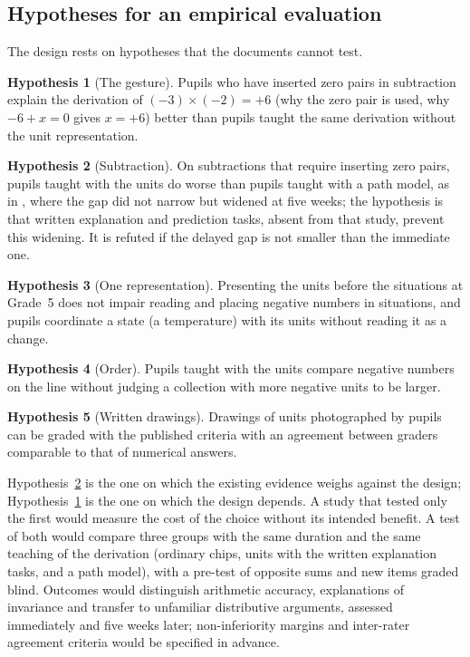 \documentclass[11pt,a4paper]{article}
\theoremstyle{definition}
\newtheorem{hypothesis}{Hypothesis}
\begin{document}
\subsection{Hypotheses for an empirical evaluation}
The design rests on hypotheses that the documents cannot test.
\begin{hypothesis}[The gesture]\label{hyp:gesture}
Pupils who have inserted zero pairs in subtraction explain the derivation of $(-3)\times(-2)=+6$ (why the zero pair is used, why $-6+x=0$ gives $x=+6$) better than pupils taught the same derivation without the unit representation.
\end{hypothesis}
\begin{hypothesis}[Subtraction]\label{hyp:subtraction}
On subtractions that require inserting zero pairs, pupils taught with the units do worse than pupils taught with a path model, as in \citet{NurnbergerHaag2015PMENA}, where the gap did not narrow but widened at five weeks; the hypothesis is that written explanation and prediction tasks, absent from that study, prevent this widening. It is refuted if the delayed gap is not smaller than the immediate one.
\end{hypothesis}
\begin{hypothesis}[One representation]
Presenting the units before the situations at Grade~5 does not impair reading and placing negative numbers in situations, and pupils coordinate a state (a temperature) with its units without reading it as a change.
\end{hypothesis}
\begin{hypothesis}[Order]
Pupils taught with the units compare negative numbers on the line without judging a collection with more negative units to be larger.
\end{hypothesis}
\begin{hypothesis}[Written drawings]
Drawings of units photographed by pupils can be graded with the published criteria with an agreement between graders comparable to that of numerical answers.
\end{hypothesis}
Hypothesis~\ref{hyp:subtraction} is the one on which the existing evidence weighs against the design; Hypothesis~\ref{hyp:gesture} is the one on which the design depends. A study that tested only the first would measure the cost of the choice without its intended benefit. A test of both would compare three groups with the same duration and the same teaching of the derivation (ordinary chips, units with the written explanation tasks, and a path model), with a pre-test of opposite sums and new items graded blind. Outcomes would distinguish arithmetic accuracy, explanations of invariance and transfer to unfamiliar distributive arguments, assessed immediately and five weeks later; non-inferiority margins and inter-rater agreement criteria would be specified in advance.
\end{document}
